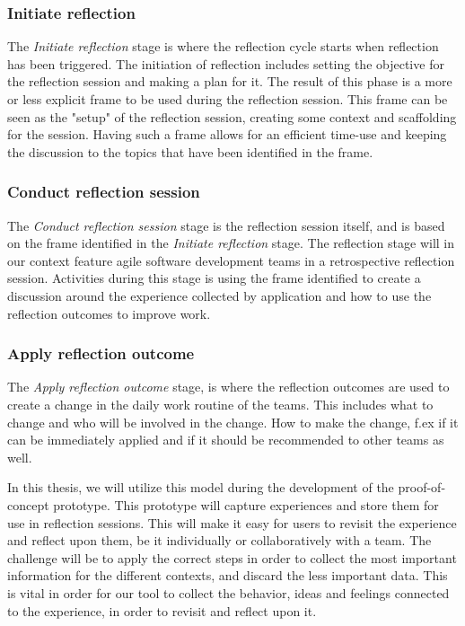 \subsubsection{Initiate reflection}
The \emph{Initiate reflection} stage is where the reflection cycle starts when reflection has been triggered. The initiation of reflection includes setting the objective for the reflection session and making a plan for it. The result of this phase is a more or less explicit frame to be used during the reflection session. This frame can be seen as the "setup" of the reflection session, creating some context and scaffolding for the session. Having such a frame allows for an efficient time-use and keeping the discussion to the topics that have been identified in the frame. 
\subsubsection{Conduct reflection session}
The \emph{Conduct reflection session} stage is the reflection session itself, and is based on the frame identified in the \emph{Initiate reflection} stage. The reflection stage will in our context feature agile software development teams in a retrospective reflection session. Activities during this stage is using the frame identified to create a discussion around the experience collected by application and how to use the reflection outcomes to improve work. 

\subsubsection{Apply reflection outcome}
The \emph{Apply reflection outcome} stage, is where the reflection outcomes are used to create a change in the daily work routine of the teams. This includes what to change and who will be involved in the change. How to make the change, f.ex if it can be immediately applied and if it should be recommended to other teams as well. 

In this thesis, we will utilize this model during the development of the proof-of-concept prototype. This prototype will capture experiences and store them for use in reflection sessions. This will make it easy for users to revisit the experience and reflect upon them, be it individually or collaboratively with a team. The challenge will be to apply the correct steps in order to collect the most important information for the different contexts, and discard the less important data. This is vital in order for our tool to collect the behavior, ideas and feelings connected to the experience, in order to revisit and reflect upon it. 


